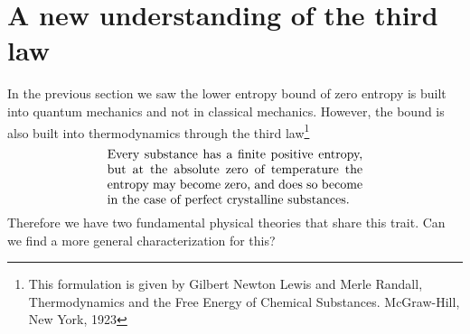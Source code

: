 \documentclass[10pt,twocolumn, nofootinbib]{revtex4-2}
\begin{document}
\section{A new understanding of the third law}


In the previous section we saw the lower entropy bound of zero entropy is built into quantum mechanics and not in classical mechanics. However, the bound is also built into thermodynamics through the third law\footnote{This formulation is given by Gilbert Newton Lewis and Merle Randall, Thermodynamics and the Free Energy of
	Chemical Substances. McGraw-Hill, New York, 1923}
\begin{align}\label{ThirdLaw}
	\parbox{2.8in}{Every substance has a finite positive entropy, but
		at the absolute zero of temperature the entropy may become zero, and does so
		become in the case of perfect crystalline substances.}
\end{align}
Therefore we have two fundamental physical theories that share this trait. Can we find a more general characterization for this?
\end{document}
